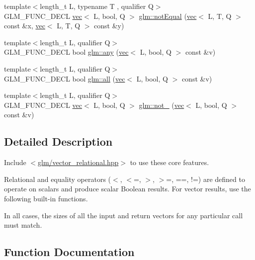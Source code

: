 \begin{DoxyCompactItemize}
\item 
{\footnotesize template$<$length\+\_\+t L, typename T , qualifier Q$>$ }\\G\+L\+M\+\_\+\+F\+U\+N\+C\+\_\+\+D\+E\+CL \hyperlink{structglm_1_1vec}{vec}$<$ L, bool, Q $>$ \hyperlink{group__core__func__vector__relational_gac5a72a973c81dc697dd8bb5d218e8251}{glm\+::not\+Equal} (\hyperlink{structglm_1_1vec}{vec}$<$ L, T, Q $>$ const \&x, \hyperlink{structglm_1_1vec}{vec}$<$ L, T, Q $>$ const \&y)
\item 
{\footnotesize template$<$length\+\_\+t L, qualifier Q$>$ }\\G\+L\+M\+\_\+\+F\+U\+N\+C\+\_\+\+D\+E\+CL bool \hyperlink{group__core__func__vector__relational_gadcc289349a96ef7642b14bc151ee4ae8}{glm\+::any} (\hyperlink{structglm_1_1vec}{vec}$<$ L, bool, Q $>$ const \&v)
\item 
{\footnotesize template$<$length\+\_\+t L, qualifier Q$>$ }\\G\+L\+M\+\_\+\+F\+U\+N\+C\+\_\+\+D\+E\+CL bool \hyperlink{group__core__func__vector__relational_gab5af106b2d5675d51af84815d937384d}{glm\+::all} (\hyperlink{structglm_1_1vec}{vec}$<$ L, bool, Q $>$ const \&v)
\item 
{\footnotesize template$<$length\+\_\+t L, qualifier Q$>$ }\\G\+L\+M\+\_\+\+F\+U\+N\+C\+\_\+\+D\+E\+CL \hyperlink{structglm_1_1vec}{vec}$<$ L, bool, Q $>$ \hyperlink{group__core__func__vector__relational_ga464f1392c934f69a917ab8bb6eda5b09}{glm\+::not\+\_\+} (\hyperlink{structglm_1_1vec}{vec}$<$ L, bool, Q $>$ const \&v)
\end{DoxyCompactItemize}


\subsection{Detailed Description}
Include $<$\hyperlink{vector__relational_8hpp}{glm/vector\+\_\+relational.\+hpp}$>$ to use these core features.

Relational and equality operators ($<$, $<$=, $>$, $>$=, ==, !=) are defined to operate on scalars and produce scalar Boolean results. For vector results, use the following built-\/in functions.

In all cases, the sizes of all the input and return vectors for any particular call must match. 

\subsection{Function Documentation}
\mbox{\label{group__core__func__vector__relational_gab5af106b2d5675d51af84815d937384d}} 
